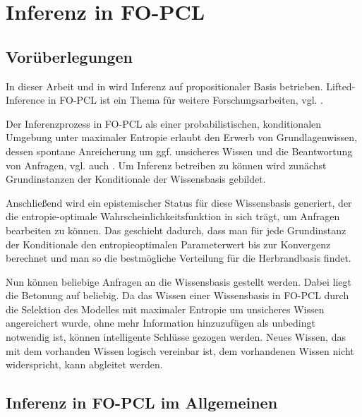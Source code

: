 \documentclass[a4paper, 11pt]{book}
\begin{document}
\chapter{Inferenz in FO-PCL}\label{Inferenz}
\section{Vorüberlegungen}
In dieser Arbeit und in \cite{Fis12} wird Inferenz auf propositionaler Basis betrieben. Lifted-Inference in FO-PCL ist ein Thema für weitere Forschungsarbeiten, vgl. \cite[Kap.8, S. 194]{Fis12}.

Der Inferenzprozess in FO-PCL als einer probabilistischen, konditionalen Umgebung unter maximaler Entropie erlaubt den Erwerb von Grundlagenwissen, dessen spontane Anreicherung um ggf. unsicheres Wissen und die Beantwortung von Anfragen, vgl. auch \cite{RRK06}.
Um Inferenz betreiben zu können wird zunächst Grundinstanzen der Konditionale der Wissensbasis gebildet.

 Anschließend wird ein epistemischer Status für diese Wissensbasis generiert, der die entropie-optimale Wahrscheinlichkeitsfunktion in sich trägt, um Anfragen bearbeiten zu können. Das geschieht dadurch, dass man für jede Grundinstanz der Konditionale den entropieoptimalen Parameterwert bis zur Konvergenz berechnet und man so die bestmögliche Verteilung für die Herbrandbasis findet.

Nun können beliebige Anfragen an die Wissensbasis gestellt werden. Dabei liegt die Betonung auf beliebig. Da das Wissen einer Wissensbasis in FO-PCL durch die Selektion des Modelles mit maximaler Entropie um unsicheres Wissen angereichert wurde, ohne mehr Information hinzuzufügen als unbedingt notwendig ist, können intelligente Schlüsse gezogen werden. Neues Wissen, das mit dem vorhanden Wissen logisch vereinbar ist, dem vorhandenen Wissen nicht widerspricht, kann abgleitet werden. 

\section{Inferenz in FO-PCL im Allgemeinen}
\end{document}
